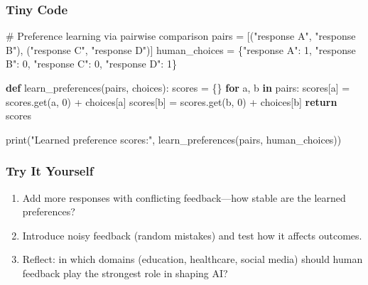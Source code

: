 \documentclass[
  letterpaper,
  DIV=11,
  numbers=noendperiod]{scrreprt}
\newenvironment{Shaded}{\begin{snugshade}}{\end{snugshade}}
\newcommand{\BuiltInTok}[1]{\textcolor[rgb]{0.00,0.23,0.31}{#1}}
\newcommand{\CommentTok}[1]{\textcolor[rgb]{0.37,0.37,0.37}{#1}}
\newcommand{\ControlFlowTok}[1]{\textcolor[rgb]{0.00,0.23,0.31}{\textbf{#1}}}
\newcommand{\DecValTok}[1]{\textcolor[rgb]{0.68,0.00,0.00}{#1}}
\newcommand{\KeywordTok}[1]{\textcolor[rgb]{0.00,0.23,0.31}{\textbf{#1}}}
\newcommand{\NormalTok}[1]{\textcolor[rgb]{0.00,0.23,0.31}{#1}}
\newcommand{\OperatorTok}[1]{\textcolor[rgb]{0.37,0.37,0.37}{#1}}
\newcommand{\StringTok}[1]{\textcolor[rgb]{0.13,0.47,0.30}{#1}}
\providecommand{\tightlist}{%
  \setlength{\itemsep}{0pt}\setlength{\parskip}{0pt}}
\begin{document}
\subsubsection{Tiny Code}\label{tiny-code-18}

\begin{Shaded}
\begin{Highlighting}[]
\CommentTok{\# Preference learning via pairwise comparison}
\NormalTok{pairs }\OperatorTok{=}\NormalTok{ [(}\StringTok{"response A"}\NormalTok{, }\StringTok{"response B"}\NormalTok{), (}\StringTok{"response C"}\NormalTok{, }\StringTok{"response D"}\NormalTok{)]}
\NormalTok{human\_choices }\OperatorTok{=}\NormalTok{ \{}\StringTok{"response A"}\NormalTok{: }\DecValTok{1}\NormalTok{, }\StringTok{"response B"}\NormalTok{: }\DecValTok{0}\NormalTok{,}
                 \StringTok{"response C"}\NormalTok{: }\DecValTok{0}\NormalTok{, }\StringTok{"response D"}\NormalTok{: }\DecValTok{1}\NormalTok{\}}

\KeywordTok{def}\NormalTok{ learn\_preferences(pairs, choices):}
\NormalTok{    scores }\OperatorTok{=}\NormalTok{ \{\}}
    \ControlFlowTok{for}\NormalTok{ a, b }\KeywordTok{in}\NormalTok{ pairs:}
\NormalTok{        scores[a] }\OperatorTok{=}\NormalTok{ scores.get(a, }\DecValTok{0}\NormalTok{) }\OperatorTok{+}\NormalTok{ choices[a]}
\NormalTok{        scores[b] }\OperatorTok{=}\NormalTok{ scores.get(b, }\DecValTok{0}\NormalTok{) }\OperatorTok{+}\NormalTok{ choices[b]}
    \ControlFlowTok{return}\NormalTok{ scores}

\BuiltInTok{print}\NormalTok{(}\StringTok{"Learned preference scores:"}\NormalTok{, learn\_preferences(pairs, human\_choices))}
\end{Highlighting}
\end{Shaded}

\subsubsection{Try It Yourself}\label{try-it-yourself-18}

\begin{enumerate}
\def\labelenumi{\arabic{enumi}.}
\tightlist
\item
  Add more responses with conflicting feedback---how stable are the
  learned preferences?
\item
  Introduce noisy feedback (random mistakes) and test how it affects
  outcomes.
\item
  Reflect: in which domains (education, healthcare, social media) should
  human feedback play the strongest role in shaping AI?
\end{enumerate}
\end{document}

